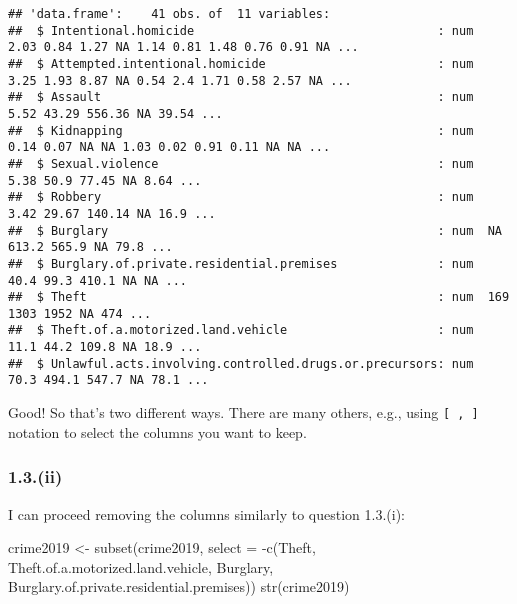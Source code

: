 \documentclass[
]{article}
\newenvironment{Shaded}{\begin{snugshade}}{\end{snugshade}}
\newcommand{\AttributeTok}[1]{\textcolor[rgb]{0.77,0.63,0.00}{#1}}
\newcommand{\FunctionTok}[1]{\textcolor[rgb]{0.00,0.00,0.00}{#1}}
\newcommand{\NormalTok}[1]{#1}
\newcommand{\OtherTok}[1]{\textcolor[rgb]{0.56,0.35,0.01}{#1}}
\newcommand{\SpecialCharTok}[1]{\textcolor[rgb]{0.00,0.00,0.00}{#1}}
\begin{document}
\begin{verbatim}
## 'data.frame':    41 obs. of  11 variables:
##  $ Intentional.homicide                                  : num  2.03 0.84 1.27 NA 1.14 0.81 1.48 0.76 0.91 NA ...
##  $ Attempted.intentional.homicide                        : num  3.25 1.93 8.87 NA 0.54 2.4 1.71 0.58 2.57 NA ...
##  $ Assault                                               : num  5.52 43.29 556.36 NA 39.54 ...
##  $ Kidnapping                                            : num  0.14 0.07 NA NA 1.03 0.02 0.91 0.11 NA NA ...
##  $ Sexual.violence                                       : num  5.38 50.9 77.45 NA 8.64 ...
##  $ Robbery                                               : num  3.42 29.67 140.14 NA 16.9 ...
##  $ Burglary                                              : num  NA 613.2 565.9 NA 79.8 ...
##  $ Burglary.of.private.residential.premises              : num  40.4 99.3 410.1 NA NA ...
##  $ Theft                                                 : num  169 1303 1952 NA 474 ...
##  $ Theft.of.a.motorized.land.vehicle                     : num  11.1 44.2 109.8 NA 18.9 ...
##  $ Unlawful.acts.involving.controlled.drugs.or.precursors: num  70.3 494.1 547.7 NA 78.1 ...
\end{verbatim}

Good! So that's two different ways. There are many others, e.g., using
\texttt{{[}\ ,\ {]}} notation to select the columns you want to keep.

\hypertarget{ii}{%
\subsubsection{1.3.(ii)}\label{ii}}

I can proceed removing the columns similarly to question 1.3.(i):

\begin{Shaded}
\begin{Highlighting}[]
\NormalTok{crime2019 }\OtherTok{\textless{}{-}} \FunctionTok{subset}\NormalTok{(crime2019,}
                    \AttributeTok{select =} \SpecialCharTok{{-}}\FunctionTok{c}\NormalTok{(Theft,}
\NormalTok{                                Theft.of.a.motorized.land.vehicle,}
\NormalTok{                                Burglary,}
\NormalTok{                                Burglary.of.private.residential.premises))}
\FunctionTok{str}\NormalTok{(crime2019)}
\end{Highlighting}
\end{Shaded}
\end{document}
